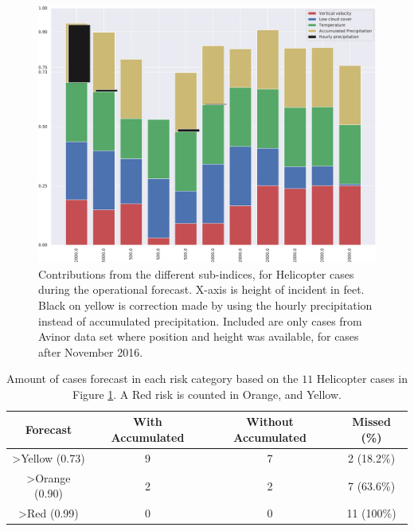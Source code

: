 \begin{figure}[H]
    \centering
    \includegraphics[width=\textwidth]{Figures/HeliAccum.pdf}
    \caption{Contributions from the different sub-indices, for Helicopter cases during the operational forecast. X-axis is height of incident in feet. Black on yellow is correction made by using the hourly precipitation instead of accumulated precipitation. Included are only cases from Avinor data set where position and height was available, for cases after November 2016.}
    \label{fig:HeliAccum}
\end{figure}

\begin{table}[H]
    \centering
    \begin{tabular}{c|c|c|c}
        Forecast & With Accumulated & Without Accumulated & Missed (\%) \\ \hline
        >Yellow (0.73) & 9 & 7 & 2 (18.2\%)\\
        >Orange (0.90) & 2 & 2 & 7 (63.6\%)\\ 
        >Red (0.99) & 0 & 0 & 11 (100\%)\\
    \end{tabular}
    \caption{Amount of cases forecast in each risk category based on the $11$ Helicopter cases in Figure \ref{fig:HeliAccum}. A Red risk is counted in Orange, and Yellow.}
    \label{tab:HeliCont}
\end{table}

